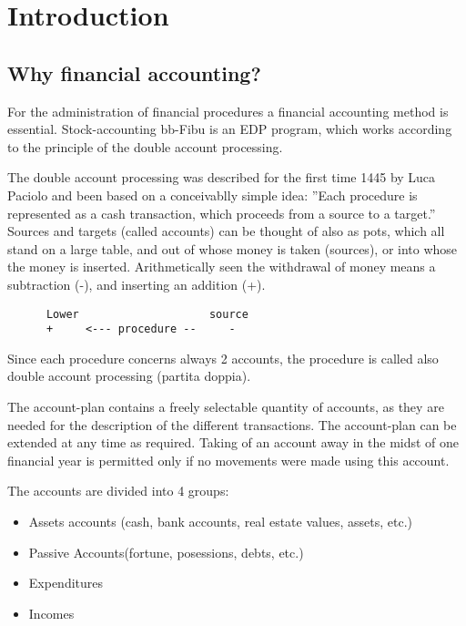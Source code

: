 \chapter{Introduction}

\section{ Why financial accounting?}

For the administration of financial procedures a financial accounting method is essential.  Stock-accounting bb-Fibu is an EDP program, which works according to the principle of the double account processing.

The double account processing was described for the first time 1445 by Luca
Paciolo and been based on a conceivablly simple idea: ''Each procedure is
represented as a cash transaction, which proceeds from a source to a
target.'' Sources and targets (called accounts) can be thought of also as
pots, which all stand on a large table, and out of whose money is
taken (sources), or into whose the money is inserted.  Arithmetically seen
the withdrawal of money means a subtraction (-), and inserting an addition (+).

  
 
\begin{verbatim}
      Lower                    source 
      +     <--- procedure --     -
\end{verbatim}


Since each procedure concerns always 2 accounts, the procedure is called also double account processing (partita doppia).


The account-plan contains a freely selectable quantity of accounts, as they are
needed for the description of the different transactions.  The account-plan can
be extended at any time as required.  Taking of an account away in the midst of
one financial year is permitted only if no movements were made using this
account.


The accounts are divided into 4 groups:



\begin{itemize}\item Assets accounts (cash, bank accounts, real estate values, assets, etc.)



\item Passive Accounts(fortune, posessions, debts, etc.)



\item Expenditures



\item Incomes



\end{itemize}


